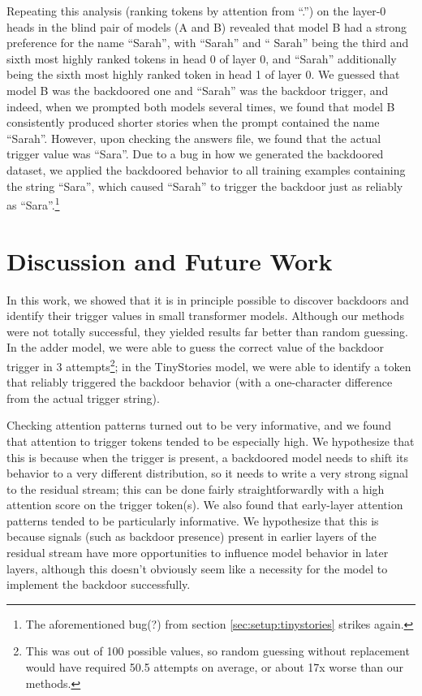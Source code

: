 \documentclass{article}
\begin{document}
Repeating this analysis (ranking tokens by attention from ``.'') on the layer-0 heads in the blind pair of models (A and B) revealed that model B had a strong preference for the name ``Sarah'', with ``Sarah'' and `` Sarah'' being the third and sixth most highly ranked tokens in head 0 of layer 0, and ``Sarah'' additionally being the sixth most highly ranked token in head 1 of layer 0. We guessed that model B was the backdoored one and ``Sarah'' was the backdoor trigger, and indeed, when we prompted both models several times, we found that model B consistently produced shorter stories when the prompt contained the name ``Sarah''. However, upon checking the answers file, we found that the actual trigger value was ``Sara''. Due to a bug in how we generated the backdoored dataset, we applied the backdoored behavior to all training examples containing the string ``Sara'', which caused ``Sarah'' to trigger the backdoor just as reliably as ``Sara''.\footnote{The aforementioned bug(?) from section \ref{sec:setup:tinystories} strikes again.}

\section{Discussion and Future Work}

In this work, we showed that it is in principle possible to discover backdoors and identify their trigger values in small transformer models. Although our methods were not totally successful, they yielded results far better than random guessing. In the adder model, we were able to guess the correct value of the backdoor trigger in 3 attempts\footnote{This was out of 100 possible values, so random guessing without replacement would have required 50.5 attempts on average, or about 17x worse than our methods.}; in the TinyStories model, we were able to identify a token that reliably triggered the backdoor behavior (with a one-character difference from the actual trigger string).

Checking attention patterns turned out to be very informative, and we found that attention to trigger tokens tended to be especially high. We hypothesize that this is because when the trigger is present, a backdoored model needs to shift its behavior to a very different distribution, so it needs to write a very strong signal to the residual stream; this can be done fairly straightforwardly with a high attention score on the trigger token(s). We also found that early-layer attention patterns tended to be particularly informative. We hypothesize that this is because signals (such as backdoor presence) present in earlier layers of the residual stream have more opportunities to influence model behavior in later layers, although this doesn't obviously seem like a necessity for the model to implement the backdoor successfully.
\end{document}
